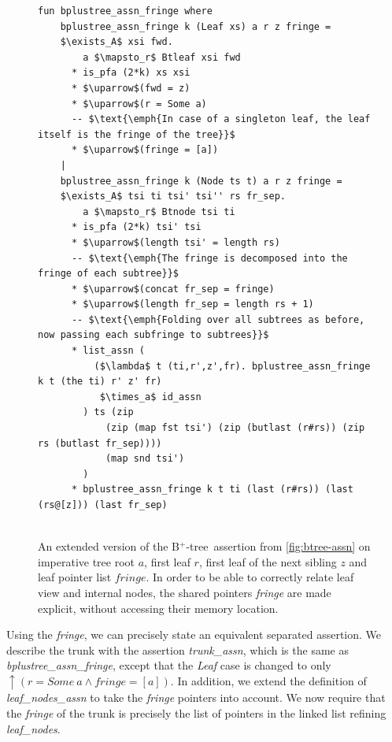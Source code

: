 \documentclass[runningheads]{llncs}
\newcommand{\btree}{B$^+$-tree}
\begin{document}
\begin{figure}
    \centering
\begin{lstlisting}[mathescape=true, language=Isabelle,label=lst:btree-assn-leaves]
fun bplustree_assn_fringe where
    bplustree_assn_fringe k (Leaf xs) a r z fringe =
    $\exists_A$ xsi fwd.
        a $\mapsto_r$ Btleaf xsi fwd
      * is_pfa (2*k) xs xsi
      * $\uparrow$(fwd = z)
      * $\uparrow$(r = Some a)
      -- $\text{\emph{In case of a singleton leaf, the leaf itself is the fringe of the tree}}$
      * $\uparrow$(fringe = [a])
    |
    bplustree_assn_fringe k (Node ts t) a r z fringe =
    $\exists_A$ tsi ti tsi' tsi'' rs fr_sep.
        a $\mapsto_r$ Btnode tsi ti
      * is_pfa (2*k) tsi' tsi
      * $\uparrow$(length tsi' = length rs)
      -- $\text{\emph{The fringe is decomposed into the fringe of each subtree}}$
      * $\uparrow$(concat fr_sep = fringe)
      * $\uparrow$(length fr_sep = length rs + 1)
      -- $\text{\emph{Folding over all subtrees as before, now passing each subfringe to subtrees}}$
      * list_assn (
          ($\lambda$ t (ti,r',z',fr). bplustree_assn_fringe k t (the ti) r' z' fr)
           $\times_a$ id_assn
        ) ts (zip 
            (zip (map fst tsi') (zip (butlast (r#rs)) (zip rs (butlast fr_sep))))
            (map snd tsi')
        )
      * bplustree_assn_fringe k t ti (last (r#rs)) (last (rs@[z])) (last fr_sep)
       
\end{lstlisting}
    \caption[\btree\ assertion with extracted fringe]{
        An extended version of the \btree\ assertion from \cref{fig:btree-assn} on imperative tree
        root $a$, first leaf $r$, first leaf of the next sibling $z$ and leaf pointer list $fringe$.
        In order to be able to correctly relate leaf view and internal nodes,
        the shared pointers \emph{fringe} are made explicit, without accessing their memory location.
    }
    \label{fig:btree-assn-leaves}
\end{figure}


Using the \emph{fringe}, we can precisely state an equivalent separated assertion.
We describe the trunk with the assertion \emph{trunk\_assn},
which is the same as \emph{bplustree\_assn\_fringe},
except that the \emph{Leaf} case is changed to only $\uparrow(r = \mathit{Some}\ a \wedge \mathit{fringe} = [a])$.
In addition, we extend the definition of \emph{leaf\_nodes\_assn}
to take the \emph{fringe} pointers into account.
We now require that the \emph{fringe} of the trunk is
precisely the list of pointers in the linked list refining \emph{leaf\_nodes}.
\end{document}
